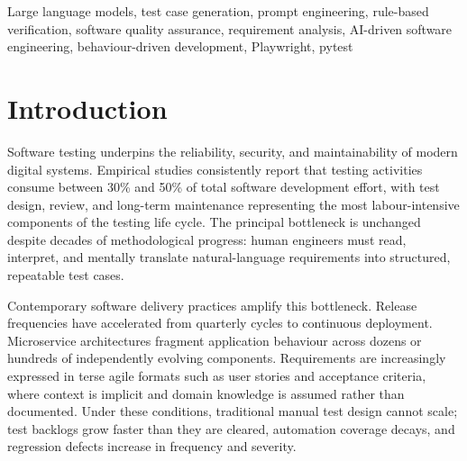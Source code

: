 \documentclass[conference]{IEEEtran}
\begin{document}
\begin{abstract}
rule set, and backend-model identifier are persisted alongside the generated artefacts. The service is consumed by the TestForge AI monorepo, which surfaces an AI-driven test authoring experience as a new wizard in the platform UI and streams generated Gherkin, Playwright, and API test artefacts into the existing framework-generator pipeline. Threats to validity, prompt and data governance, and a reproducibility artefact are discussed. The paper and the deployed service therefore report on the same framework configuration, exercised on the same 312-requirement dataset with the same prompt templates and verification rules, and differ only in packaging.
\end{abstract}

\begin{IEEEkeywords}
Large language models, test case generation, prompt engineering, rule-based verification, software quality assurance, requirement analysis, AI-driven software engineering, behaviour-driven development, Playwright, pytest
\end{IEEEkeywords}

\section{Introduction}

Software testing underpins the reliability, security, and maintainability of modern digital systems. Empirical studies consistently report that testing activities consume between 30\% and 50\% of total software development effort, with test design, review, and long-term maintenance representing the most labour-intensive components of the testing life cycle. The principal bottleneck is unchanged despite decades of methodological progress: human engineers must read, interpret, and mentally translate natural-language requirements into structured, repeatable test cases.

Contemporary software delivery practices amplify this bottleneck. Release frequencies have accelerated from quarterly cycles to continuous deployment. Microservice architectures fragment application behaviour across dozens or hundreds of independently evolving components. Requirements are increasingly expressed in terse agile formats such as user stories and acceptance criteria, where context is implicit and domain knowledge is assumed rather than documented. Under these conditions, traditional manual test design cannot scale; test backlogs grow faster than they are cleared, automation coverage decays, and regression defects increase in frequency and severity.
\end{document}
